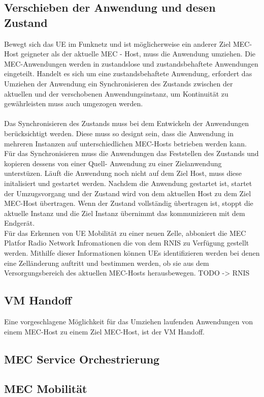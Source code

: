 \documentclass[runningheads]{llncs}
\numberwithin{figure}{section}
\begin{document}
\subsection{Verschieben der Anwendung und desen Zustand}
Bewegt sich das UE im Funknetz und ist möglicherweise ein anderer Ziel MEC-Host geigneter als der aktuelle
MEC - Host, muss die Anwendung umziehen. Die MEC-Anwendungen werden in zustandslose und zustandsbehaftete Anwendungen eingeteilt.
Handelt es sich um eine zustandsbehaftete Anwendung, 
erfordert das Umziehen der Anwendung ein Synchronisieren des Zustands zwischen der aktuellen und der
verschobenen Anwendungsinstanz, um Kontinuität zu gewährleisten
muss auch umgezogen werden. 
\\
\\
Das Synchronisieren des Zustands muss bei dem Entwickeln der Anwendungen berücksichtigt werden. Diese muss so designt sein, 
dass die Anwendung in mehreren Instanzen auf unterschiedlichen MEC-Hosts betrieben werden kann. 
Für das Synchronisieren muss die Anwendungen das Feststellen des Zustands und kopieren dessens von einer Quell- Anwendung 
zu einer Zielanwendung unterstüzen. 
Läuft die Anwendung noch nicht auf dem Ziel Host, muss diese initalisiert und gestartet werden.
Nachdem die Anwendung gestartet ist, startet der Umzugsvorgang und der Zustand wird von dem aktuellen 
Host zu dem Ziel MEC-Host übertragen. Wenn der Zustand vollständig übertragen ist, stoppt die aktuelle Instanz
und die Ziel Instanz übernimmt das kommunizieren mit dem Endgerät.
\\
Für das Erkennen von UE Mobilität zu einer neuen Zelle, abboniert die MEC Platfor Radio Network Infromationen die von dem RNIS zu
Verfügung gestellt werden. Mithilfe dieser Informationen können UEs identifizieren werden bei denen eine Zelländerung auftritt 
und bestimmen werden, ob sie aus dem Versorgungsbereich des aktuellen MEC-Hosts herausbewegen.
TODO -> RNIS
\subsection{VM Handoff}
Eine vorgeschlagene Möglichkeit \cite{etsiETSIGSMEC} für das Umziehen laufenden Anwendungen von einem MEC-Host zu einem Ziel MEC-Host, 
ist der VM Handoff.  \cite{Ha2015AdaptiveVH}
\subsection{MEC Service Orchestrierung}
\label{subsec:MEC Service Orchestrierung}
\subsection{MEC Mobilität}
\label{subsec:MEC Mobilität}
\end{document}
